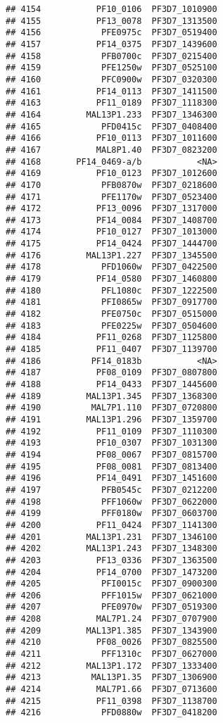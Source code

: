 \documentclass{article}\usepackage[]{graphicx}\usepackage[]{color}
\makeatletter
\newenvironment{kframe}{%
 \def\at@end@of@kframe{}%
 \ifinner\ifhmode%
  \def\at@end@of@kframe{\end{minipage}}%
  \begin{minipage}{\columnwidth}%
 \fi\fi%
 \def\FrameCommand##1{\hskip\@totalleftmargin \hskip-\fboxsep
 \colorbox{shadecolor}{##1}\hskip-\fboxsep
     \hskip-\linewidth \hskip-\@totalleftmargin \hskip\columnwidth}%
 \MakeFramed {\advance\hsize-\width
   \@totalleftmargin\z@ \linewidth\hsize
   \@setminipage}}%
 {\par\unskip\endMakeFramed%
 \at@end@of@kframe}
\newenvironment{knitrout}{}{} %
\makeatother
\begin{document}
\begin{knitrout}
\begin{kframe}
\begin{verbatim}
## 4154           PF10_0106  PF3D7_1010900
## 4155           PF13_0078  PF3D7_1313500
## 4156            PFE0975c  PF3D7_0519400
## 4157           PF14_0375  PF3D7_1439600
## 4158            PFB0700c  PF3D7_0215400
## 4159            PFE1250w  PF3D7_0525100
## 4160            PFC0900w  PF3D7_0320300
## 4161           PF14_0113  PF3D7_1411500
## 4163           PF11_0189  PF3D7_1118300
## 4164         MAL13P1.233  PF3D7_1346300
## 4165            PFD0415c  PF3D7_0408400
## 4166           PF10_0113  PF3D7_1011600
## 4167           MAL8P1.40  PF3D7_0823200
## 4168       PF14_0469-a/b           <NA>
## 4169           PF10_0123  PF3D7_1012600
## 4170            PFB0870w  PF3D7_0218600
## 4171            PFE1170w  PF3D7_0523400
## 4172           PF13_0096  PF3D7_1317000
## 4173           PF14_0084  PF3D7_1408700
## 4174           PF10_0127  PF3D7_1013000
## 4175           PF14_0424  PF3D7_1444700
## 4176         MAL13P1.227  PF3D7_1345500
## 4178            PFD1060w  PF3D7_0422500
## 4179           PF14_0580  PF3D7_1460800
## 4180            PFL1080c  PF3D7_1222500
## 4181            PFI0865w  PF3D7_0917700
## 4182            PFE0750c  PF3D7_0515000
## 4183            PFE0225w  PF3D7_0504600
## 4184           PF11_0268  PF3D7_1125800
## 4185           PF11_0407  PF3D7_1139700
## 4186          PF14_0183b           <NA>
## 4187           PF08_0109  PF3D7_0807800
## 4188           PF14_0433  PF3D7_1445600
## 4189         MAL13P1.345  PF3D7_1368300
## 4190          MAL7P1.110  PF3D7_0720800
## 4191         MAL13P1.296  PF3D7_1359700
## 4192           PF11_0109  PF3D7_1110300
## 4193           PF10_0307  PF3D7_1031300
## 4194           PF08_0067  PF3D7_0815700
## 4195           PF08_0081  PF3D7_0813400
## 4196           PF14_0491  PF3D7_1451600
## 4197            PFB0545c  PF3D7_0212200
## 4198            PFF1060w  PF3D7_0622000
## 4199            PFF0180w  PF3D7_0603700
## 4200           PF11_0424  PF3D7_1141300
## 4201         MAL13P1.231  PF3D7_1346100
## 4202         MAL13P1.243  PF3D7_1348300
## 4203           PF13_0336  PF3D7_1363500
## 4204           PF14_0700  PF3D7_1473200
## 4205            PFI0015c  PF3D7_0900300
## 4206            PFF1015w  PF3D7_0621000
## 4207            PFE0970w  PF3D7_0519300
## 4208           MAL7P1.24  PF3D7_0707900
## 4209         MAL13P1.385  PF3D7_1343900
## 4210           PF08_0026  PF3D7_0825500
## 4211            PFF1310c  PF3D7_0627000
## 4212         MAL13P1.172  PF3D7_1333400
## 4213          MAL13P1.35  PF3D7_1306900
## 4214           MAL7P1.66  PF3D7_0713600
## 4215           PF11_0398  PF3D7_1138700
## 4216            PFD0880w  PF3D7_0418200

\end{verbatim}
\end{kframe}
\end{knitrout}
\end{document}

